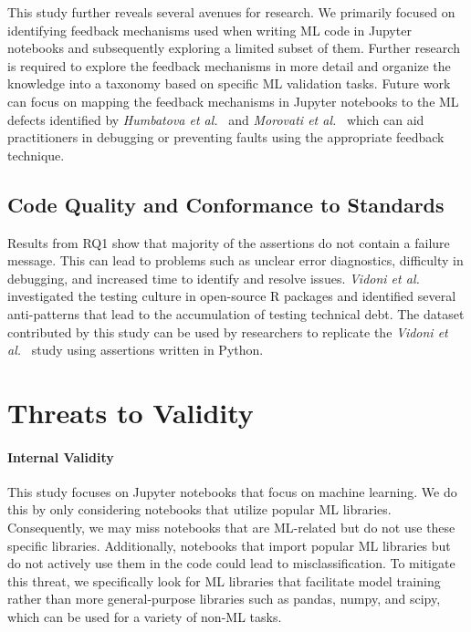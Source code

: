 This study further reveals several avenues for research. We primarily focused on identifying feedback mechanisms used when writing ML code in Jupyter notebooks and subsequently exploring a limited subset of them. Further research is required to explore the feedback mechanisms in more detail and organize the knowledge into a taxonomy based on specific ML validation tasks. Future work can focus on mapping the feedback mechanisms in Jupyter notebooks to the ML defects identified by \emph{Humbatova et al.}~\cite{humbatova2020taxonomy} and \emph{Morovati et al.}~\cite{morovati2023bugs} which can aid practitioners in debugging or preventing faults using the appropriate feedback technique.

\subsection{Code Quality and Conformance to Standards}

Results from RQ1 show that majority of the assertions do not contain a failure message. This can lead to problems such as unclear error diagnostics, difficulty in debugging, and increased time to identify and resolve issues. 
\emph{Vidoni et al.}~\cite{vidoni2021evaluating} investigated the testing culture in open-source R packages and identified several anti-patterns that lead to the accumulation of testing technical debt. The dataset contributed by this study can be used by researchers to replicate the \emph{Vidoni et al.}~\cite{vidoni2021evaluating} study using assertions written in Python.

\section{Threats to Validity}\label{sec:threats}

\paragraph{\textbf{Internal Validity}} This study focuses on Jupyter notebooks that focus on machine learning. We do this by only considering notebooks that utilize popular ML libraries. Consequently, we may miss notebooks that are ML-related but do not use these specific libraries. Additionally, notebooks that import popular ML libraries but do not actively use them in the code could lead to misclassification. To mitigate this threat, we specifically look for ML libraries that facilitate model training rather than more general-purpose libraries such as pandas, numpy, and scipy, which can be used for a variety of non-ML tasks.

